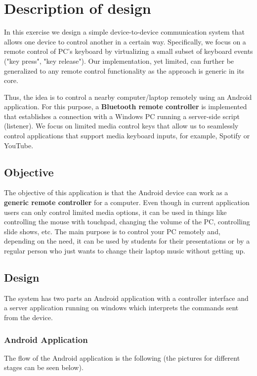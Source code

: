 \documentclass{article}
\title{
Exercise 3: Small IoT Implementation
\bigskip
\author{Andrei Golubev 2621924 \\ Hassan Shaheen 2600602}
\date{\parbox{\linewidth}{\centering
  \endgraf\bigskip
  University of Oulu, Oulu, Finland
  \endgraf\monthyeardate\today}}
}
\begin{document}
\maketitle
\thispagestyle{empty}
\newpage

\section{Description of design}

In this exercise we design a simple device-to-device communication system that allows one device to
control another in a certain way. Specifically, we focus on a remote control of PC's keyboard by
virtualizing a small subset of keyboard events ("key press", "key release"). Our implementation, yet
limited, can further be generalized to any remote control functionality as the approach is generic
in its core.

Thus, the idea is to control a nearby computer/laptop remotely using an Android application. For
this purpose, a \textbf{Bluetooth remote controller} is implemented that establishes a connection
with a Windows PC running a server-side script (listener). We focus on limited media control keys
that allow us to seamlessly control applications that support media keyboard inputs, for example,
Spotify or YouTube.

\subsection{Objective}

The objective of this application is that the Android device can work as a \textbf{generic remote
controller} for a computer. Even though in current application users can only control limited media
options, it can be used in things like controlling the mouse with touchpad, changing the volume of
the PC, controlling slide shows, etc. The main purpose is to control your PC remotely and, depending
on the need, it can be used by students for their presentations or by a regular person who just
wants to change their laptop music without getting up.

\subsection{Design}
The system has two parts an Android application with a controller interface and a server application
running on windows which interprets the commands sent from the device.

\subsubsection{Android Application}
The flow of the Android application is the following (the pictures for different stages can be seen
below).
\end{document}
